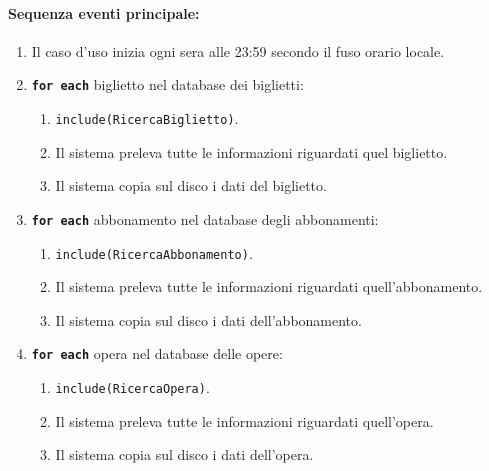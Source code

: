 \documentclass{article}
\begin{document}
	\paragraph{Sequenza eventi principale:}
\begin{enumerate}[itemsep=8pt,parsep=0pt]
		
		\item Il caso d'uso inizia ogni sera alle 23:59 secondo il fuso orario locale.


  		\item \texttt{\textbf{for each}} biglietto nel database dei biglietti:
	          \begin{enumerate}	[leftmargin=28pt]
			\item  \texttt{{include(RicercaBiglietto)}}.
	          	\item Il sistema preleva tutte le informazioni riguardati quel biglietto.
			\item Il sistema copia sul disco i dati del biglietto.
	          \end{enumerate}

  		\item \texttt{\textbf{for each}} abbonamento nel database degli abbonamenti:
	          \begin{enumerate}	[leftmargin=28pt]
			\item  \texttt{{include(RicercaAbbonamento)}}.
	          	\item Il sistema preleva tutte le informazioni riguardati quell'abbonamento.
			\item Il sistema copia sul disco i dati dell'abbonamento.
	          \end{enumerate}

  		\item \texttt{\textbf{for each}} opera nel database delle opere:
	          \begin{enumerate}	[leftmargin=28pt]
			\item  \texttt{{include(RicercaOpera)}}.
	          	\item Il sistema preleva tutte le informazioni riguardati quell'opera.
			\item Il sistema copia sul disco i dati dell'opera.
	          \end{enumerate}


\end{enumerate}
\end{document}
